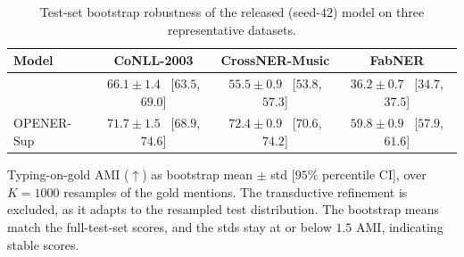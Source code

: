 \begin{table}[t]
\centering
\caption{Test-set bootstrap robustness of the released (seed-$42$) model on three representative datasets.}
\label{tab:bootstrap}
\small
\begin{threeparttable}
\begin{tabular}{lccc}
\toprule
Model & CoNLL-2003 & CrossNER-Music & FabNER \\
\midrule
\zsind{}   & $66.1 \pm 1.4$ ~[$63.5$, $69.0$] & $55.5 \pm 0.9$ ~[$53.8$, $57.3$] & $36.2 \pm 0.7$ ~[$34.7$, $37.5$] \\
OPENER-Sup & $71.7 \pm 1.5$ ~[$68.9$, $74.6$] & $72.4 \pm 0.9$ ~[$70.6$, $74.2$] & $59.8 \pm 0.9$ ~[$57.9$, $61.6$] \\
\bottomrule
\end{tabular}
\begin{tablenotes}[flushleft]
\footnotesize
\item Typing-on-gold AMI ($\uparrow$) as bootstrap mean $\pm$ std [$95\%$ percentile CI], over $K{=}1000$ resamples of the gold mentions. The transductive refinement is excluded, as it adapts to the resampled test distribution. The bootstrap means match the full-test-set scores, and the stds stay at or below $1.5$ AMI, indicating stable scores.
\end{tablenotes}
\end{threeparttable}
\end{table}

